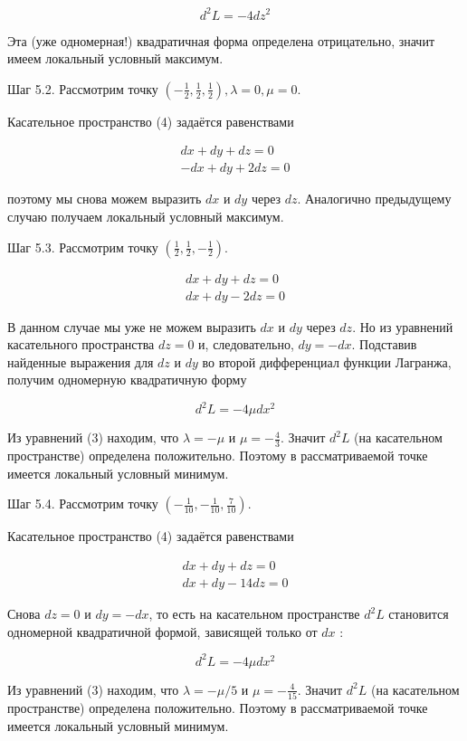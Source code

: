 \documentclass[a4paper,12pt]{article} %
\begin{document}
$$
d^{2} L=-4 d z^{2}
$$

Эта (уже одномерная!) квадратичная форма определена отрицательно, значит имеем локальный условный максимум.

Шаг 5.2. Рассмотрим точку $\left(-\frac{1}{2}, \frac{1}{2}, \frac{1}{2}\right), \lambda=0, \mu=0$.

Касательное пространство (4) задаётся равенствами

$$
\begin{gathered}
d x+d y+d z=0 \\
-d x+d y+2 d z=0
\end{gathered}
$$

поэтому мы снова можем выразить $d x$ и $d y$ через $d z$. Аналогично предыдущему случаю получаем локальный условный максимум.

Шаг 5.3. Рассмотрим точку $\left(\frac{1}{2}, \frac{1}{2},-\frac{1}{2}\right)$.

$$
\begin{gathered}
d x+d y+d z=0 \\
d x+d y-2 d z=0
\end{gathered}
$$

В данном случае мы уже не можем выразить $d x$ и $d y$ через $d z$. Но из уравнений касательного пространства $d z=0$ и, следовательно, $d y=-d x$. Подставив найденные выражения для $d z$ и $d y$ во второй дифференциал функции Лагранжа, получим одномерную квадратичную форму

$$
d^{2} L=-4 \mu d x^{2}
$$

Из уравнений (3) находим, что $\lambda=-\mu$ и $\mu=-\frac{4}{3}$. Значит $d^{2} L$ (на касательном пространстве) определена положительно. Поэтому в рассматриваемой точке имеется локальный условный минимум.

Шаг 5.4. Рассмотрим точку $\left(-\frac{1}{10},-\frac{1}{10}, \frac{7}{10}\right)$.

Касательное пространство (4) задаётся равенствами

$$
\begin{gathered}
d x+d y+d z=0 \\
d x+d y-14 d z=0
\end{gathered}
$$

Снова $d z=0$ и $d y=-d x$, то есть на касательном пространстве $d^{2} L$ становится одномерной квадратичной формой, зависящей только от $d x$ :

$$
d^{2} L=-4 \mu d x^{2}
$$

Из уравнений (3) находим, что $\lambda=-\mu / 5$ и $\mu=-\frac{4}{15}$. Значит $d^{2} L$ (на касательном пространстве) определена положительно. Поэтому в рассматриваемой точке имеется локальный условный минимум.
\end{document}
